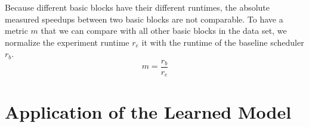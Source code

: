 Because different basic blocks have their different runtimes, the absolute measured speedups between two basic blocks are not comparable.
To have a metric $m$ that we can compare with all other basic blocks in the data set, we normalize the experiment runtime $r_e$ it with the runtime of the baseline scheduler $r_b$.
\begin{equation}
    m=\frac{r_b}{r_e}
\end{equation}

\section{Application of the Learned Model}
\label{sec:approach:ml-scheduler}





